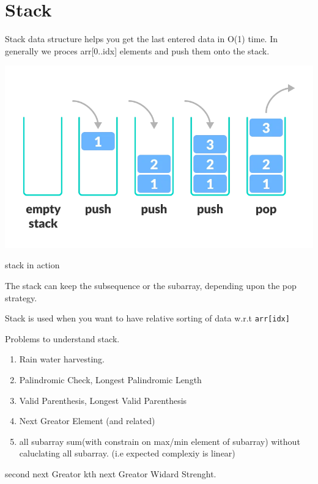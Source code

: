 \chapter{Stack}\label{chp:stack}

Stack data structure helps you get the last entered data in O(1) time.
In generally we proces arr[0..idx] elements and push them onto the stack.

\begin{marginfigure}  
\includegraphics[width=\marginparwidth]{../resources/stack_intro.png}
\caption{stack in action}
\end{marginfigure}

The stack can keep the subsequence or the subarray, depending upon the pop strategy.

Stack is used when you want to have relative sorting of data w.r.t \verb|arr[idx]|

Problems to understand stack.
    \begin{enumerate}
        \item Rain water harvesting.
        \item Palindromic Check, Longest Palindromic Length
        \item Valid Parenthesis, Longest Valid Parenthesis
        \item Next Greator Element (and related)
        \item all subarray sum(with constrain on max/min element of subarray) without caluclating all subarray. (i.e expected complexiy is linear)
    \end{enumerate}

second next Greator
kth next Greator
Widard Strenght.



